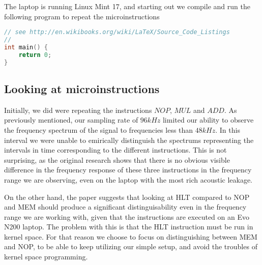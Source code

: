 The laptop is running Linux Mint 17, and starting out we compile and run the following program to repeat the microinstructions 

\begin{lstlisting}[language=C, caption={Simple Microinstruction Loop}]
// see http://en.wikibooks.org/wiki/LaTeX/Source_Code_Listings
// 
int main() {
	return 0;
}
\end{lstlisting}


\subsection{Looking at microinstructions}\label{sec:ch4_microinstructions}
Initially, we did were repeating the instructions \( NOP\), \( MUL\) and \( ADD\).
As previously mentioned, our sampling rate of \( 96kHz\) limited our ability to observe the frequency spectrum of the signal to frequencies less than \( 48kHz\).
In this interval we were unable to emirically distinguish the spectrums representing the intervals in time corresponding to the different instructions.
This is not surprising, as the original research shows that there is no obvious visible difference in the frequency response of these three instructions in the frequency range we are observing, even on the laptop with the most rich acoustic leakage. 

On the other hand, the paper suggests that looking at HLT compared to NOP and MEM should produce a significant distinguisability even in the frequency range we are working with, given that the instructions are executed on an Evo N200 laptop.
The problem with this is that the HLT instruction must be run in kernel space.
For that reason we choose to focus on distinguishing between MEM and NOP, to be able to keep utilizing our simple setup, and avoid the troubles of kernel space programming.

